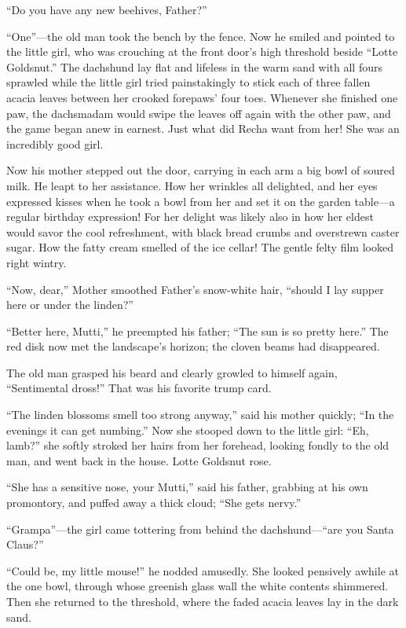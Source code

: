 \documentclass[12pt,a4paper]{article}
\begin{document}
“Do you have any new beehives, Father?”

“One”—the old man took the bench by the fence. Now he smiled and pointed to the little girl, who was crouching at the front door’s high threshold beside “Lotte Goldsnut.” The dachshund lay flat and lifeless in the warm sand with all fours sprawled while the little girl tried painstakingly to stick each of three fallen acacia leaves between her crooked forepaws’ four toes. Whenever she finished one paw, the dachsmadam would swipe the leaves off again with the other paw, and the game began anew in earnest. Just what did Recha want from her! She was an incredibly good girl.

Now his mother stepped out the door, carrying in each arm a big bowl of soured milk. He leapt to her assistance. How her wrinkles all delighted, and her eyes expressed kisses when he took a bowl from her and set it on the garden table—a regular birthday expression! For her delight was likely also in how her eldest would savor the cool refreshment, with black bread crumbs and overstrewn caster sugar. How the fatty cream smelled of the ice cellar! The gentle felty film looked right wintry.

“Now, dear,” Mother smoothed Father’s snow-white hair, “should I lay supper here or under the linden?”

“Better here, Mutti,” he preempted his father; “The sun is so pretty here.” The red disk now met the landscape’s horizon; the cloven beams had disappeared.

The old man grasped his beard and clearly growled to himself again, “Sentimental dross!” That was his favorite trump card.

“The linden blossoms smell too strong anyway,” said his mother quickly; “In the evenings it can get numbing.” Now she stooped down to the little girl: “Eh, lamb?” she softly stroked her hairs from her forehead, looking fondly to the old man, and went back in the house. Lotte Goldsnut rose.

“She has a sensitive nose, your Mutti,” said his father, grabbing at his own promontory, and puffed away a thick cloud; “She gets nervy.”

“Grampa”—the girl came tottering from behind the dachshund—“are you Santa Claus?”

“Could be, my little mouse!” he nodded amusedly. She looked pensively awhile at the one bowl, through whose greenish glass wall the white contents shimmered. Then she returned to the threshold, where the faded acacia leaves lay in the dark sand.
\end{document}
